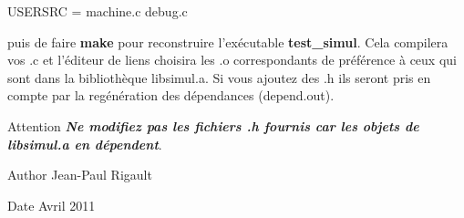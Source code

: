 \begin{DoxyCode}
USERSRC = machine.c debug.c 
\end{DoxyCode}


puis de faire {\bfseries make} pour reconstruire l'exécutable {\bfseries test\-\_\-simul}. \-Cela compilera vos {\ttfamily }.c et l'éditeur de liens choisira les {\ttfamily }.o correspondants de préférence à ceux qui sont dans la bibliothèque {\ttfamily libsimul.\-a}. \-Si vous ajoutez des {\ttfamily }.h ils seront pris en compte par la regénération des dépendances ({\ttfamily depend.\-out}).

\begin{DoxyAttention}{\-Attention}
{\itshape {\bfseries \-Ne modifiez pas les fichiers {\ttfamily }.h fournis car les objets de {\ttfamily libsimul.\-a} en dépendent}\/}.
\end{DoxyAttention}
\begin{DoxyAuthor}{\-Author}
\-Jean-\/\-Paul \-Rigault 
\end{DoxyAuthor}
\begin{DoxyDate}{\-Date}
\-Avril 2011 
\end{DoxyDate}
